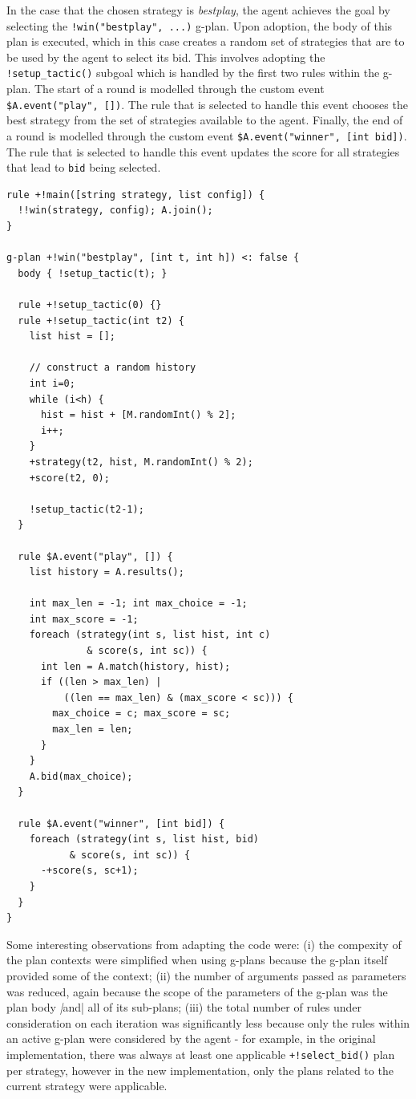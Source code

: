 In the case that the chosen strategy is \emph{bestplay}, the agent achieves the goal by selecting 
the \verb|!win("bestplay", ...)| g-plan. Upon adoption, the body of this plan is executed, which 
in this case creates a random set of strategies that are to be used by the agent to select its 
bid. This involves adopting the \verb|!setup_tactic()| subgoal which is handled by the first two 
rules within the g-plan. The start of a round is modelled through the custom event 
\verb|$A.event("play", [])|. The rule that is selected to handle this event chooses the best 
strategy from the set of strategies available to the agent. Finally, the end of a round is modelled 
through the custom event \verb|$A.event("winner", [int bid])|. The rule that is selected to handle 
this event updates the score for all strategies that lead to \verb|bid| being selected.

{\small
\begin{verbatim}
rule +!main([string strategy, list config]) {
  !!win(strategy, config); A.join();
}

g-plan +!win("bestplay", [int t, int h]) <: false {
  body { !setup_tactic(t); }

  rule +!setup_tactic(0) {}
  rule +!setup_tactic(int t2) {
    list hist = [];
			
    // construct a random history
    int i=0;
    while (i<h) {
      hist = hist + [M.randomInt() % 2];
      i++;
    }
    +strategy(t2, hist, M.randomInt() % 2);
    +score(t2, 0);
		
    !setup_tactic(t2-1);
  }
		
  rule $A.event("play", []) { 
    list history = A.results();
			
    int max_len = -1; int max_choice = -1;
    int max_score = -1;
    foreach (strategy(int s, list hist, int c) 
              & score(s, int sc)) {
      int len = A.match(history, hist);
      if ((len > max_len) | 
          ((len == max_len) & (max_score < sc))) {
        max_choice = c; max_score = sc;
        max_len = len;
      }
    }
    A.bid(max_choice);
  }

  rule $A.event("winner", [int bid]) {
    foreach (strategy(int s, list hist, bid) 
           & score(s, int sc)) {
      -+score(s, sc+1);
    }
  }
}
\end{verbatim}}

Some interesting observations from adapting the code were: (i) the compexity of the plan contexts 
were simplified when using g-plans because the g-plan itself provided some of the context; (ii) 
the number of arguments passed as parameters was reduced, again because the scope of the parameters 
of the g-plan was the plan body \emph|and| all of its sub-plans; (iii) the total number of rules 
under consideration on each iteration was significantly less because only the rules within an 
active g-plan were considered by the agent - for example, in the original implementation, there 
was always at least one applicable \verb|+!select_bid()| plan per strategy, however in the new 
implementation, only the plans related to the current strategy were applicable.

